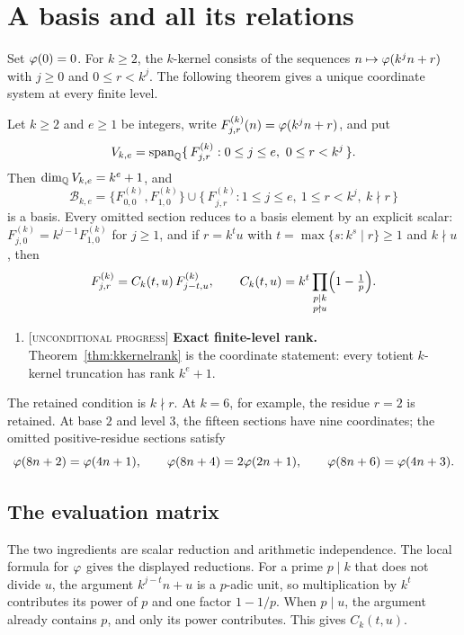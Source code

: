 \documentclass[11pt]{article}
\newcommand{\stag}[1]{{\normalfont\footnotesize\textsc{[#1]}}}
\begin{document}
\section{A basis and all its relations}\label{sec:results}
Set $\varphi(0)=0$. For $k\ge2$, the $k$-kernel consists of the sequences
$n\mapsto\varphi(k^jn+r)$ with $j\ge0$ and $0\le r<k^j$.
The following theorem gives a unique coordinate system at every finite level.
\begin{theorem}
\label{thm:kkernelrank}
Let $k\ge2$ and $e\ge1$ be integers, write $F^{(k)}_{j,r}(n)=\varphi(k^jn+r)$, and put
\[
 V_{k,e}=\operatorname{span}_{\mathbb{Q}}
 \{\,F^{(k)}_{j,r}:0\le j\le e,\ 0\le r<k^j\,\}.
\]
Then $\dim_{\mathbb{Q}}V_{k,e}=k^e+1$, and
\[
 \mathcal B_{k,e}
 =\{F^{(k)}_{0,0},F^{(k)}_{1,0}\}
 \cup\{\,F^{(k)}_{j,r}:1\le j\le e,\ 1\le r<k^j,\ k\nmid r\,\}
\]
is a basis.  Every omitted section reduces to a basis element by an explicit
scalar: $F^{(k)}_{j,0}=k^{j-1}F^{(k)}_{1,0}$ for $j\ge1$, and if $r=k^tu$ with
$t=\max\{s:k^s\mid r\}\ge1$ and $k\nmid u$, then
\[
 F^{(k)}_{j,r}=C_k(t,u)\,F^{(k)}_{j-t,u},
 \qquad
 C_k(t,u)=k^t\prod_{\substack{p\mid k\\ p\nmid u}}\Bigl(1-\tfrac1p\Bigr).
\]
\end{theorem}
\begin{enumerate}
\item\label{res:rank} \stag{unconditional progress}
\textbf{Exact finite-level rank.}  Theorem~\ref{thm:kkernelrank} is the
coordinate statement: every totient $k$-kernel truncation has rank $k^e+1$.
\end{enumerate}
The retained condition is $k\nmid r$. At $k=6$, for example, the residue
$r=2$ is retained. At base $2$ and level $3$, the fifteen sections have nine
coordinates; the omitted positive-residue sections satisfy
\[
 \varphi(8n+2)=\varphi(4n+1),\qquad
 \varphi(8n+4)=2\varphi(2n+1),\qquad
 \varphi(8n+6)=\varphi(4n+3).
\]

\subsection{The evaluation matrix}\label{sec:rank}
The two ingredients are scalar reduction and arithmetic independence.
The local formula for $\varphi$ gives the displayed reductions. For a prime
$p\mid k$ that does not divide $u$, the argument $k^{j-t}n+u$ is a $p$-adic
unit, so multiplication by $k^t$ contributes its power of $p$ and one factor
$1-1/p$. When $p\mid u$, the argument already contains $p$, and only its
power contributes. This gives $C_k(t,u)$.
\end{document}

